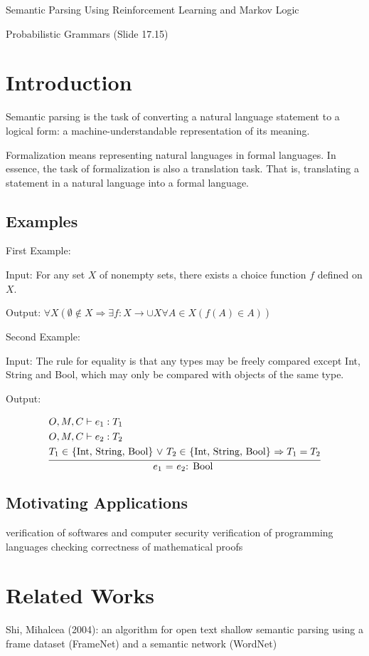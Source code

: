 \documentclass[5pt]{article}
\newcommand{\infertext}[2]{\infer{{\textrm{#1}}}{#2}}
\begin{document}
Semantic Parsing Using Reinforcement Learning and Markov Logic

Probabilistic Grammars (Slide 17.15)

\section{Introduction} 
	Semantic parsing is the task of converting a natural language statement to a logical form: a machine-understandable representation of its meaning. 

	Formalization means representing natural languages in formal languages. In essence, the task of formalization is also a translation task. That is, translating a statement in a natural language into a formal language. 

	\subsection{Examples}
		First Example: 

		Input: For any set $X$ of nonempty sets, there exists a choice function $f$ defined on $X$. 

		Output: $\forall X (\emptyset \not\in X \Rightarrow \exists f: X \rightarrow \cup{X} \forall A \in X (f(A) \in A)) $

		Second Example: 

		Input: The rule for equality is that any types may be freely compared except Int, String and Bool, which may only be compared with objects of the same type. 

		Output: 

		\[
			\infertext{$e_1$ = $e_2$: Bool }{
				\begin{aligned}
				& \textrm{$O, M, C \vdash e_1: T_1$ }\\
				& \textrm{$O, M, C \vdash e_2: T_2$ }\\
				& \textrm{$T_1 \in$ \{Int, String, Bool\} $\vee$ $T_2 \in$ \{Int, String, Bool\} $\Rightarrow T_1 = T_2 $}
				\end{aligned}
			}
		\]

	\subsection{Motivating Applications}
		verification of softwares and computer security
		verification of programming languages
		checking correctness of mathematical proofs

\section{Related Works}
	Shi, Mihalcea (2004): an algorithm for open text shallow semantic parsing using a frame dataset (FrameNet) and a semantic network (WordNet)
\end{document}
